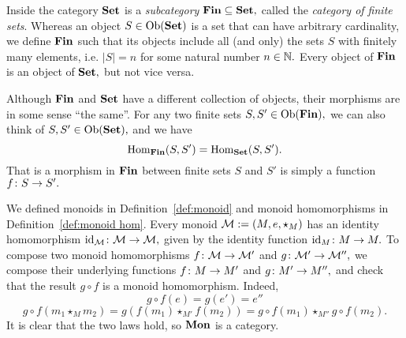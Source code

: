 \documentclass[../main/CT4S-EN-RU]{subfiles}
\begin{document}
\begin{exampleRUS}
\end{exampleRUS}

\begin{exampleENG}\label{ex:Fin}
Inside the category ${\mathbf{Set}}$ is a {\em subcategory} ${\mathbf{Fin}}\subseteq{\mathbf{Set}},$ called the {\em category of finite sets}. Whereas an object $S\in\operatorname{Ob}({\mathbf{Set}})$ is a set that can have arbitrary cardinality, we define ${\mathbf{Fin}}$ such that its objects include all (and only) the sets $S$ with finitely many elements, i.e. $|S|=n$ for some natural number $n\in{\mathbb N}.$ Every object of ${\mathbf{Fin}}$ is an object of ${\mathbf{Set}},$ but not vice versa.

Although ${\mathbf{Fin}}$ and ${\mathbf{Set}}$ have a different collection of objects, their morphisms are in some sense “the same”. For any two finite sets $S,S'\in\operatorname{Ob}({\mathbf{Fin}}),$ we can also think of $S,S'\in\operatorname{Ob}({\mathbf{Set}}),$ and we have
$$\operatorname{Hom}_{\mathbf{Fin}}(S,S')=\operatorname{Hom}_{\mathbf{Set}}(S,S').$$
That is a morphism in ${\mathbf{Fin}}$ between finite sets $S$ and $S'$ is simply a function $f\colon S\rightarrow S'.$
\end{exampleENG}

\begin{exampleRUS}\label{ex:Fin}
\end{exampleRUS}

\begin{exampleENG}\label{ex:mon is cat}
We defined monoids in Definition~\ref{def:monoid} and monoid homomorphisms in Definition~\ref{def:monoid hom}. Every monoid $\mathcal{M}:=(M,e,\star_M)$ has an identity homomorphism $\operatorname{id}_\mathcal{M}\colon\mathcal{M}\rightarrow\mathcal{M},$ given by the identity function $\operatorname{id}_M\colon M\rightarrow M.$ To compose two monoid homomorphisms $f\colon\mathcal{M}\rightarrow\mathcal{M}'$ and $g\colon\mathcal{M}'\rightarrow\mathcal{M}'',$ we compose their underlying functions $f\colon M\rightarrow M'$ and $g\colon M'\rightarrow M'',$ and check that the result $g\circ f$ is a monoid homomorphism. Indeed,
$$g\circ f(e)=g(e')=e''$$
$$g\circ f(m_1\star_Mm_2)=g(f(m_1)\star_{M'}f(m_2))=g\circ f(m_1)\star_{M''}g\circ f(m_2).$$
It is clear that the two laws hold, so ${\mathbf{Mon}}$ is a category.
\end{exampleENG}

\begin{exampleRUS}\label{ex:mon is cat}
\end{exampleRUS}
\end{document}
